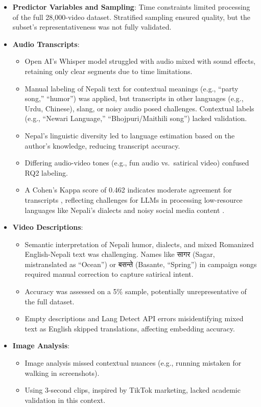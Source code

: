 \documentclass[12pt,a4paper]{report}
\begin{document}
\begin{itemize}
    \item \textbf{Predictor Variables and Sampling}: Time constraints limited processing of the full 28,000-video dataset. Stratified sampling ensured quality, but the subset’s representativeness was not fully validated.

    \item \textbf{Audio Transcripts}: 
        \begin{itemize}
            \item Open AI’s Whisper model struggled with audio mixed with sound effects, retaining only clear segments due to time limitations.
            \item Manual labeling of Nepali text for contextual meanings (e.g., ``party song,'' ``humor'') was applied, but transcripts in other languages (e.g., Urdu, Chinese), slang, or noisy audio posed challenges. Contextual labels (e.g., ``Newari Language,'' ``Bhojpuri/Maithili song'') lacked validation.
            \item Nepal’s linguistic diversity led to language estimation based on the author’s knowledge, reducing transcript accuracy.
            \item Differing audio-video tones (e.g., fun audio vs.\ satirical video) confused RQ2 labeling.
            \item A Cohen’s Kappa score of 0.462 indicates moderate agreement for transcripts \parencite{datatab2025, kolena2025}, reflecting challenges for LLMs in processing low-resource languages like Nepali’s dialects and noisy social media content \parencite{icuc2025, leanmean2023}.
        \end{itemize}

    \item \textbf{Video Descriptions}:
        \begin{itemize}
            \item Semantic interpretation of Nepali humor, dialects, and mixed Romanized English-Nepali text was challenging. Names like \texthindi{सागर} (Sagar, mistranslated as ``Ocean'') or \texthindi{बसन्ते} (Basante, ``Spring'') in campaign songs required manual correction to capture satirical intent.
            \item Accuracy was assessed on a 5\% sample, potentially unrepresentative of the full dataset.
            \item Empty descriptions and Lang Detect API errors misidentifying mixed text as English skipped translations, affecting embedding accuracy.
        \end{itemize}
\newpage
    \item \textbf{Image Analysis}:
        \begin{itemize}
            \item Image analysis missed contextual nuances (e.g., running mistaken for walking in screenshots).
            \item Using 3-second clips, inspired by TikTok marketing, lacked academic validation in this context.
        \end{itemize}


\end{itemize}
\end{document}
